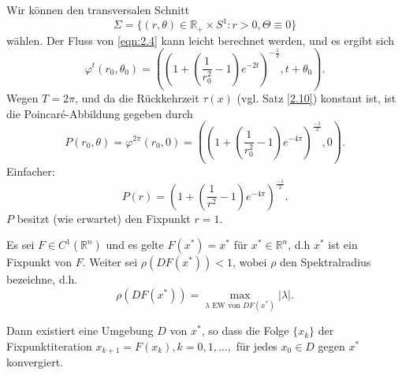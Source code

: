 \documentclass[main.tex]{subfiles}
\begin{document}
\begin{bsp}
\begin{center}
\end{center}

Wir können den transversalen Schnitt
$$Σ = \{ (r,θ) \in ℝ_+ \times S^1: r>0, Θ \equiv 0 \}$$
wählen. 
Der Fluss von \eqref{eqn:2.4} kann leicht berechnet werden, und es ergibt sich
$$φ^t ( r_0, θ_0) = \left( \left( 1 + \left( \frac{1}{r_0^2} - 1 \right) e^{-2t} \right)^{-\frac{1}{2}} , t+ θ_0 \right).$$
Wegen $T = 2π$, und da die Rückkehrzeit $τ(x)$ (vgl. Satz \ref{2.10}) konstant ist, ist die Poincaré-Abbildung gegeben durch
$$P(r_0, θ) = φ^{2π} (r_0, 0) = \left( \left( 1 +  \left( \frac{1}{r_0^2} - 1 \right) e^{-4π} \right)^{\frac{-1}{2}},0\right).$$
Einfacher: 
$$P(r)= \left( 1 + \left( \frac{1}{r^2} - 1 \right) e^{-4π} \right) ^{\frac{-1}{2}}.$$
$P$ besitzt (wie erwartet) den Fixpunkt $r=1$.
\end{bsp}

\begin{bem*}
Es sei $F\in C^1(ℝ^n)$ und es gelte $F(x^*) = x^*$ für $x^* \in ℝ^n$, d.h $x^*$ ist ein Fixpunkt von $F$. Weiter sei $ρ(DF(x^*))<1$, wobei $ρ$ den Spektralradius bezeichne,
d.h. 
$$ρ(DF(x^*)) = \max_{λ\text{ EW von $DF(x^*)$}} |λ|.$$

Dann existiert eine Umgebung $D$ von $x^*$, so dass die Folge $\{x_k\}$ der Fixpunktiteration $x_{k+1} = F(x_k), k=0,1,…,$ für jedes $x_0\in D$ gegen $x^*$ konvergiert.
\end{bem*}
\end{document}
